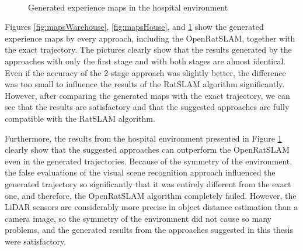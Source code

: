 \begin{figure}[!tbp]
    \centering
    \hfill
    \\
    \hfill
    \caption{Generated experience maps in the hospital environment}
    \label{fig:mapsHospital}
\end{figure}

Figures \ref{fig:mapsWarehouse}, \ref{fig:mapsHouse}, and \ref{fig:mapsHospital} show the generated experience maps by every approach, including the OpenRatSLAM, together with the exact trajectory. The pictures clearly show that the results generated by the approaches with only the first stage and with both stages are almost identical. Even if the accuracy of the 2-stage approach was slightly better, the difference was too small to influence the results of the RatSLAM algorithm significantly. However, after comparing the generated maps with the exact trajectory, we can see that the results are satisfactory and that the suggested approaches are fully compatible with the RatSLAM algorithm.\par
Furthermore, the results from the hospital environment presented in Figure \ref{fig:mapsHospital} clearly show that the suggested approaches can outperform the OpenRatSLAM even in the generated trajectories. Because of the symmetry of the environment, the false evaluations of the visual scene recognition approach influenced the generated trajectory so significantly that it was entirely different from the exact one, and therefore, the OpenRatSLAM algorithm completely failed. However, the LiDAR sensors are considerably more precise in object distance estimation than a camera image, so the symmetry of the environment did not cause so many problems, and the generated results from the approaches suggested in this thesis were satisfactory.
